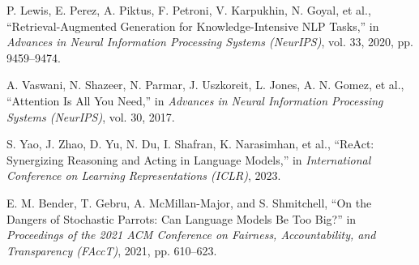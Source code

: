 \vspace{2mm}

\noindent [8] P. Lewis, E. Perez, A. Piktus, F. Petroni, V. Karpukhin, N. Goyal, et al., ``Retrieval-Augmented Generation for Knowledge-Intensive NLP Tasks,'' in \textit{Advances in Neural Information Processing Systems (NeurIPS)}, vol. 33, 2020, pp. 9459--9474.

\vspace{2mm}

\noindent [9] A. Vaswani, N. Shazeer, N. Parmar, J. Uszkoreit, L. Jones, A. N. Gomez, et al., ``Attention Is All You Need,'' in \textit{Advances in Neural Information Processing Systems (NeurIPS)}, vol. 30, 2017.

\vspace{2mm}

\noindent [10] S. Yao, J. Zhao, D. Yu, N. Du, I. Shafran, K. Narasimhan, et al., ``ReAct: Synergizing Reasoning and Acting in Language Models,'' in \textit{International Conference on Learning Representations (ICLR)}, 2023.

\vspace{2mm}

\noindent [11] E. M. Bender, T. Gebru, A. McMillan-Major, and S. Shmitchell, ``On the Dangers of Stochastic Parrots: Can Language Models Be Too Big?'' in \textit{Proceedings of the 2021 ACM Conference on Fairness, Accountability, and Transparency (FAccT)}, 2021, pp. 610--623.

\newpage

